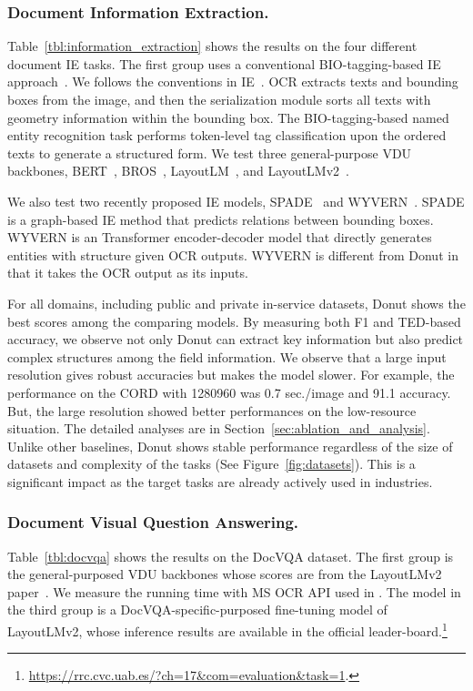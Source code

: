 \documentclass[runningheads]{llncs}
\newcommand\ours{{{\mbox{Donut}}}\xspace}
\begin{document}
\subsubsection{Document Information Extraction.}

Table~\ref{tbl:information_extraction} shows the results on the four different document IE tasks.
The first group uses a conventional BIO-tagging-based IE approach~\cite{hwang2019pot}. We follows the conventions in IE~\cite{xu2019_layoutLM,hong2021bros}. OCR extracts texts and bounding boxes from the image, and then the serialization module sorts all texts with geometry information within the bounding box. The BIO-tagging-based named entity recognition task performs token-level tag classification upon the ordered texts to generate a structured form. We test three general-purpose VDU backbones, BERT~\cite{devlinBERT2018}, BROS~\cite{hong2021bros}, LayoutLM~\cite{xu2019_layoutLM}, and LayoutLMv2~\cite{xu-etal-2021-layoutlmv2,layoutxlm}.

We also test two recently proposed IE models, SPADE~\cite{hwang2020spade} and WYVERN~\cite{hwang2021costeffective}. SPADE is a graph-based IE method that predicts relations between bounding boxes. WYVERN is an Transformer encoder-decoder model that directly generates entities with structure given OCR outputs. WYVERN is different from \ours in that it takes the OCR output as its inputs.

For all domains, including public and private in-service datasets, \ours shows the best scores among the comparing models.
By measuring both F1 and TED-based accuracy, we observe not only \ours can extract key information but also predict complex structures among the field information.
We observe that a large input resolution gives robust accuracies but makes the model slower. For example, the performance on the CORD with 1280960 was 0.7 sec./image and 91.1 accuracy. But, the large resolution showed better performances on the low-resource situation. The detailed analyses are in Section~\ref{sec:ablation_and_analysis}.
Unlike other baselines, \ours shows stable performance regardless of the size of datasets and complexity of the tasks (See Figure~\ref{fig:datasets}). This is a significant impact as the target tasks are already actively used in industries.


\subsubsection{Document Visual Question Answering.}
Table~\ref{tbl:docvqa} shows the results on the DocVQA dataset.
The first group is the general-purposed VDU backbones whose scores are from the LayoutLMv2 paper~\cite{xu-etal-2021-layoutlmv2}.
We measure the running time with MS OCR API used in \cite{xu-etal-2021-layoutlmv2}.
The model in the third group is a DocVQA-specific-purposed fine-tuning model of LayoutLMv2, 
whose inference results are available in the official leader-board.\footnote{\url{https://rrc.cvc.uab.es/?ch=17&com=evaluation&task=1}.}
\end{document}

